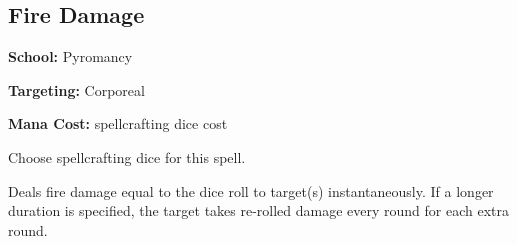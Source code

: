 \subsection*{Fire Damage}

\noindent
\textbf{School:} Pyromancy

\noindent
\textbf{Targeting:} Corporeal

\noindent
\textbf{Mana Cost:} spellcrafting dice cost

Choose spellcrafting dice for this spell.

Deals fire damage equal to the dice roll to target(s) instantaneously. If a longer
duration is specified, the target takes re-rolled damage every round for each
extra round.
